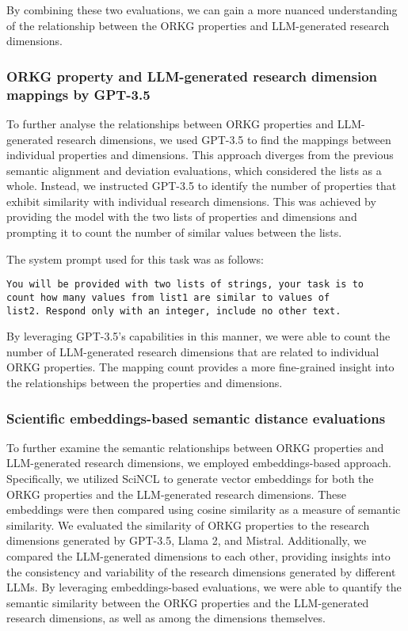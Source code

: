 By combining these two evaluations, we can gain a more nuanced understanding of the relationship between the ORKG properties and LLM-generated research dimensions.

\subsubsection{ORKG property and LLM-generated research dimension mappings by GPT-3.5}

To further analyse the relationships between ORKG properties and LLM-generated research dimensions, we used GPT-3.5 to find the mappings between individual properties and dimensions. This approach diverges from the previous semantic alignment and deviation evaluations, which considered the lists as a whole. Instead, we instructed GPT-3.5 to identify the number of properties that exhibit similarity with individual research dimensions. This was achieved by providing the model with the two lists of properties and dimensions and prompting it to count the number of similar values between the lists. 

The system prompt used for this task was as follows:

\begin{verbatim}
You will be provided with two lists of strings, your task is to 
count how many values from list1 are similar to values of 
list2. Respond only with an integer, include no other text.
\end{verbatim}

By leveraging GPT-3.5's capabilities in this manner, we were able to count the number of LLM-generated research dimensions that are related to individual ORKG properties. The mapping count provides a more fine-grained insight into the relationships between the properties and dimensions.

\subsubsection{Scientific embeddings-based semantic distance evaluations}

To further examine the semantic relationships between ORKG properties and LLM-generated research dimensions, we employed embeddings-based approach. Specifically, we utilized SciNCL to generate vector embeddings for both the ORKG properties and the LLM-generated research dimensions. These embeddings were then compared using cosine similarity as a measure of semantic similarity. We evaluated the similarity of ORKG properties to the research dimensions generated by GPT-3.5, Llama 2, and Mistral. Additionally, we compared the LLM-generated dimensions to each other, providing insights into the consistency and variability of the research dimensions generated by different LLMs. By leveraging embeddings-based evaluations, we were able to quantify the semantic similarity between the ORKG properties and the LLM-generated research dimensions, as well as among the dimensions themselves. 

